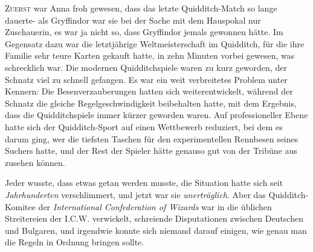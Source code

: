 
\lettrine{Z}{uerst} war Anna froh gewesen, dass das letzte Quidditch-Match so lange dauerte- als Gryffindor war sie bei der Sache mit dem Hauspokal nur Zuschauerin, es war ja nicht so, dass Gryffindor jemals gewonnen hätte. Im Gegensatz dazu war die letztjährige Weltmeisterschaft im Quidditch, für die ihre Familie sehr teure Karten gekauft hatte, in zehn Minuten vorbei gewesen, was schrecklich war. Die modernen Quidditchspiele waren zu kurz geworden, der Schnatz viel zu schnell gefangen. Es war ein weit verbreitetes Problem unter Kennern: Die Besenverzauberungen hatten sich weiterentwickelt, während der Schnatz die gleiche Regelgeschwindigkeit beibehalten hatte, mit dem Ergebnis, dass die Quidditchspiele immer kürzer geworden waren.
Auf professioneller Ebene hatte sich der Quidditch-Sport auf einen Wettbewerb reduziert, bei dem es darum ging, wer die tiefsten Taschen für den experimentellen Rennbesen seines Suchers hatte, und der Rest der Spieler hätte genauso gut von der Tribüne aus zusehen können.

Jeder wusste, dass etwas getan werden musste, die Situation hatte sich seit \emph{Jahrhunderten} verschlimmert, und jetzt war sie \emph{unerträglich}. Aber das Quidditch-Komitee der \emph{International Confederation of Wizards} war in die üblichen Streitereien der I.C.W. verwickelt, schreiende Disputationen zwischen Deutschen und Bulgaren, und irgendwie konnte sich niemand darauf einigen, wie genau man die Regeln in Ordnung bringen sollte.

